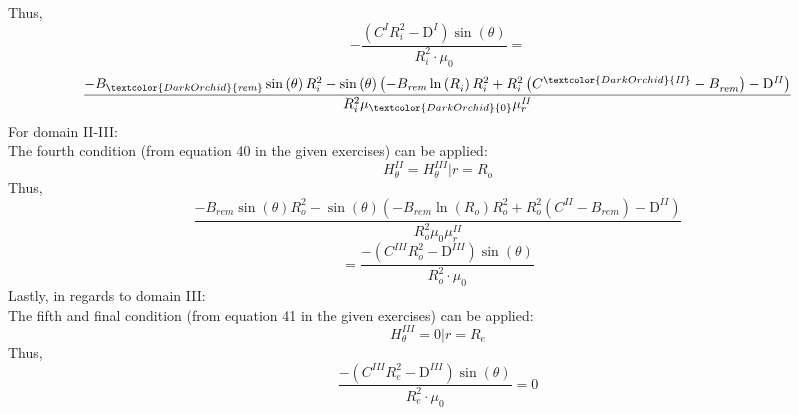 \documentclass{article}
\begin{document}
Thus,
\begin{equation}
   -\frac{\left(C^{I}R_{i}^{2}-\mathrm{D}^{I}\right)\sin\left(\theta\right)}{R_{i}^{2}\cdot\mu_{0}} = 
\end{equation}
\begin{equation}
    \frac{-B_{\textcolor{DarkOrchid}{\mathit{rem}}}\sin\left(\theta\right)R_{i}^{2}-\sin\left(\theta\right)\left(-B_{\mathit{rem}}\ln\left(R_{i}^{}\right)R_{i}^{2}+R_{i}^{2}\left(C^{\textcolor{DarkOrchid}{\mathit{II}}}-B_{\mathit{rem}}^{}\right)-\mathrm{D}_{}^{\mathit{II}}\right)}{R_{i}^{2}\mu_{\textcolor{DarkOrchid}{0}}\mu_{r}^{\mathit{II}}}
\end{equation}
For domain II-III:
\\
The fourth condition (from equation 40 in the given exercises) can be applied:
\begin{equation}
H_{\theta}^{\mathit{II}}=H_{\theta}^{\mathit{III}}| r =R_{o}
\end{equation}
Thus,
\begin{equation}
    \frac{-B_{\mathit{rem}}\sin\left(\theta\right)R_{o}^{2}-\sin\left(\theta\right)\left(-B_{\mathit{rem}}\ln\left(R_{o}^{}\right)R_{o}^{2}+R_{o}^{2}\left(C^{\mathit{II}}-B_{\mathit{rem}}^{}\right)-\mathrm{D}_{}^{\mathit{II}}\right)}{R_{o}^{2}\mu_{0}\mu_{r}^{\mathit{II}}}
\end{equation}
\begin{equation}
    = \frac{-\left(C^{\mathit{III}}R_{o}^{2}-\mathrm{D}_{}^{\mathit{III}}\right)\sin\left(\theta\right)}{R_{o}^{2}\cdot \mu_{0}}
\end{equation}
Lastly, in regards to domain III:
\\
The fifth and final condition (from equation 41 in the given exercises) can be applied:
\begin{equation}
H_{\theta}^{\mathit{III}}=0| r =R_{e}
\end{equation}
Thus,
\begin{equation}
    \frac{-\left(C^{\mathit{III}}R_{e}^{2}-\mathrm{D}_{}^{\mathit{III}}\right)\sin\left(\theta\right)}{R_{e}^{2}\cdot\mu_{0}}=0
\end{equation}
\end{document}
